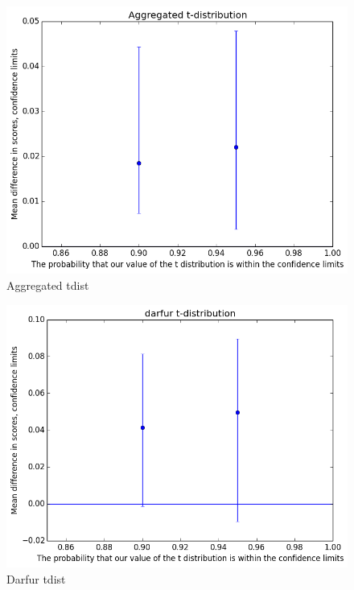 			\begin{figure}[h] 
				\centering 
				\includegraphics[width=\textwidth]{aggregated_tdist.png} 
				\caption{Aggregated tdist}
			\end{figure}
			\begin{figure}[h] 
				\centering 
				\includegraphics[width=\textwidth]{darfur_tdist.png} 
				\caption{Darfur tdist}
			\end{figure}
